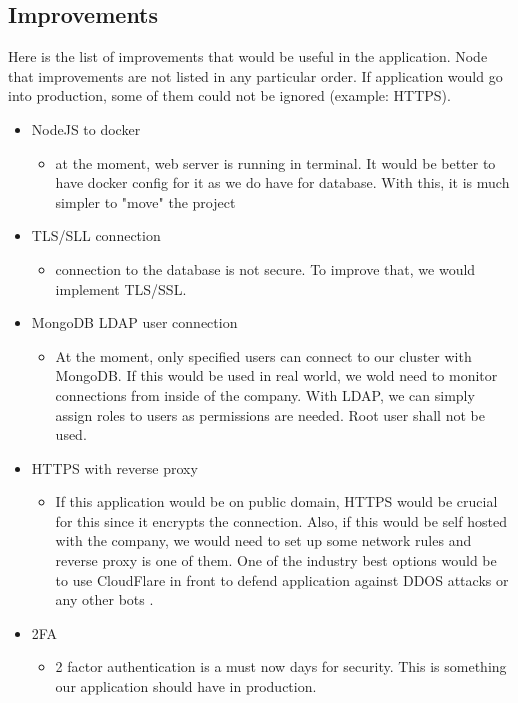  \subsection{Improvements}
  Here is the list of improvements that would be useful in the application. Node that improvements are not listed in any particular order. If application would go into production, some of them could not be ignored (example: HTTPS).
  
\begin{itemize}
  \item NodeJS to docker
  \begin{itemize}
    \item at the moment, web server is running in terminal. It would be better to have docker config for it as we do have for database. With this, it is much simpler to "move" the project
  \end{itemize}
  
  \item TLS/SLL connection
  \begin{itemize}
    \item connection to the database is not secure. To improve that, we would implement TLS/SSL.
  \end{itemize}
  
  \item MongoDB LDAP user connection
  \begin{itemize}
    \item At the moment, only specified users can connect to our cluster with MongoDB. If this would be used in real world, we wold need to monitor connections from inside of the company. With LDAP, we can simply assign roles to users as permissions are needed. Root user shall not be used.
  \end{itemize}

  \item HTTPS with reverse proxy
  \begin{itemize}
    \item If this application would be on public domain, HTTPS would be crucial for this since it encrypts the connection. Also, if this would be self hosted with the company, we would need to set up some network rules and reverse proxy is one of them. One of the industry best options would be to use CloudFlare in front to defend application against DDOS attacks or any other bots \parencite{web:Cloudflare}.  
  \end{itemize}
  
  \item 2FA
  \begin{itemize}
    \item 2 factor authentication is a must now days for security. This is something our application should have in production.
  \end{itemize}
  

\end{itemize}
